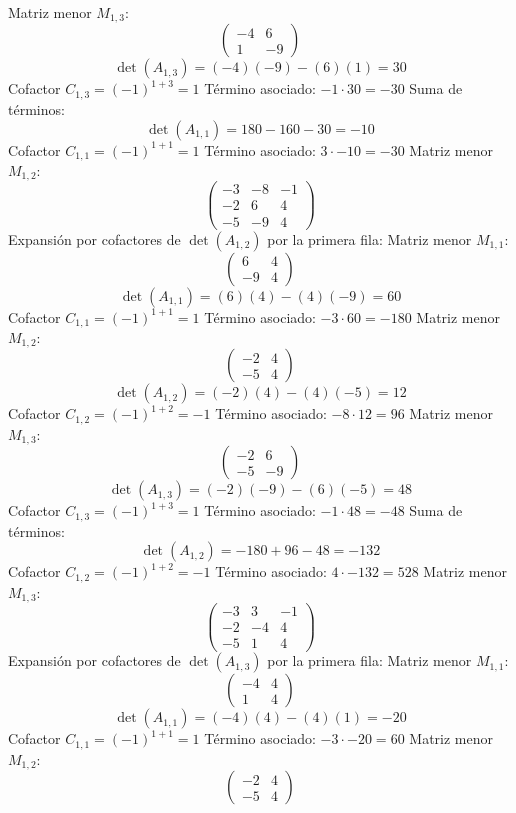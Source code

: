 \documentclass{article}
\begin{document}
Matriz menor $M_{1,3}$:
\[\begin{pmatrix}-4 & 6 \\ 1 & -9\end{pmatrix}\]
\[\det(A_{1,3}) = (-4)(-9) - (6)(1) = 30\]
Cofactor $C_{1,3} = (-1)^{1+3} = 1$
Término asociado: $ -1 \cdot 30 = -30 $
Suma de términos:
\[\det(A_{1,1}) = 180 - 160 - 30 = -10\]
Cofactor $C_{1,1} = (-1)^{1+1} = 1$
Término asociado: $ 3 \cdot -10 = -30 $
Matriz menor $M_{1,2}$:
\[\begin{pmatrix}-3 & -8 & -1 \\ -2 & 6 & 4 \\ -5 & -9 & 4\end{pmatrix}\]
Expansión por cofactores de $\det(A_{1,2})$ por la primera fila:
Matriz menor $M_{1,1}$:
\[\begin{pmatrix}6 & 4 \\ -9 & 4\end{pmatrix}\]
\[\det(A_{1,1}) = (6)(4) - (4)(-9) = 60\]
Cofactor $C_{1,1} = (-1)^{1+1} = 1$
Término asociado: $ -3 \cdot 60 = -180 $
Matriz menor $M_{1,2}$:
\[\begin{pmatrix}-2 & 4 \\ -5 & 4\end{pmatrix}\]
\[\det(A_{1,2}) = (-2)(4) - (4)(-5) = 12\]
Cofactor $C_{1,2} = (-1)^{1+2} = -1$
Término asociado: $ -8 \cdot 12 = 96 $
Matriz menor $M_{1,3}$:
\[\begin{pmatrix}-2 & 6 \\ -5 & -9\end{pmatrix}\]
\[\det(A_{1,3}) = (-2)(-9) - (6)(-5) = 48\]
Cofactor $C_{1,3} = (-1)^{1+3} = 1$
Término asociado: $ -1 \cdot 48 = -48 $
Suma de términos:
\[\det(A_{1,2}) = -180 + 96 - 48 = -132\]
Cofactor $C_{1,2} = (-1)^{1+2} = -1$
Término asociado: $ 4 \cdot -132 = 528 $
Matriz menor $M_{1,3}$:
\[\begin{pmatrix}-3 & 3 & -1 \\ -2 & -4 & 4 \\ -5 & 1 & 4\end{pmatrix}\]
Expansión por cofactores de $\det(A_{1,3})$ por la primera fila:
Matriz menor $M_{1,1}$:
\[\begin{pmatrix}-4 & 4 \\ 1 & 4\end{pmatrix}\]
\[\det(A_{1,1}) = (-4)(4) - (4)(1) = -20\]
Cofactor $C_{1,1} = (-1)^{1+1} = 1$
Término asociado: $ -3 \cdot -20 = 60 $
Matriz menor $M_{1,2}$:
\[\begin{pmatrix}-2 & 4 \\ -5 & 4\end{pmatrix}\]
\end{document}
